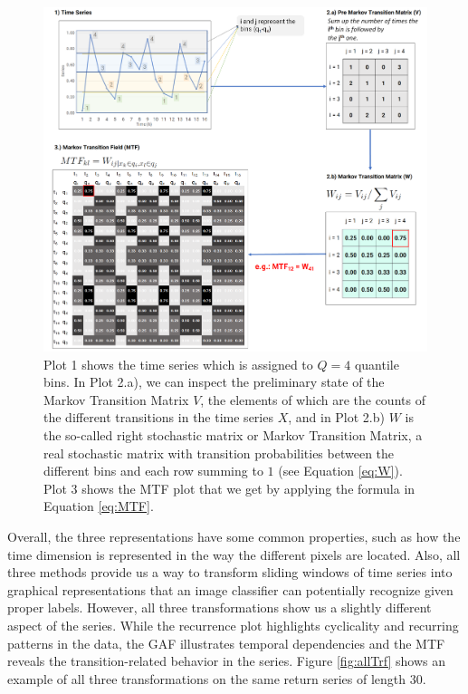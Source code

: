 \documentclass[12pt, a4paper]{article}
\begin{document}
\begin{figure}[!htb]
    \centering
    \includegraphics[width=\textwidth]{images/MTF.png}
    \caption{Plot 1 shows the time series which is assigned to $Q=4$ quantile bins. In Plot 2.a), we can inspect the preliminary state of the Markov Transition Matrix $V$, the elements of which are the counts of the different transitions in the time series $X$, and in Plot 2.b) $W$ is the so-called right stochastic matrix or Markov Transition Matrix, a real stochastic matrix with transition probabilities between the different bins and each row summing to $1$ (see Equation \ref{eq:W}). Plot 3 shows the MTF plot that we get by applying the formula in Equation \ref{eq:MTF}.}
    \label{fig:MTF}
\end{figure}

Overall, the three representations have some common properties, such as how the time dimension is represented in the way the different pixels are located. Also, all three methods provide us a way to transform sliding windows of time series into graphical representations that an image classifier can potentially recognize given proper labels. However, all three transformations show us a slightly different aspect of the series. While the recurrence plot highlights cyclicality and recurring patterns in the data, the GAF illustrates temporal dependencies and the MTF reveals the transition-related behavior in the series. Figure \ref{fig:allTrf} shows an example of all three transformations on the same return series of length $30$.
\end{document}
